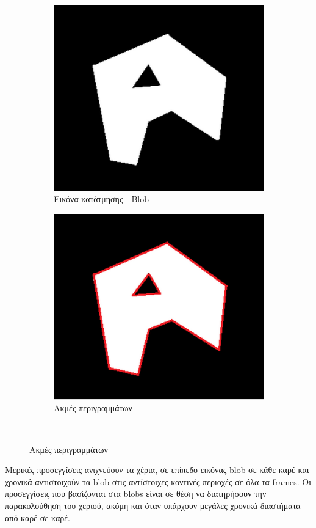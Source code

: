 \begin{figure}[H]
\begin{subfigure}{.5\textwidth}
  \centering
  \includegraphics[width=.6\linewidth]{Files/Figures/blob1.png}
  \caption[Εικόνα κατάτμησης - Blob]{Εικόνα κατάτμησης - Blob}
  \label{fig:sfig1}
\end{subfigure}%
\begin{subfigure}{.5\textwidth}
  \centering
  \includegraphics[width=.6\linewidth]{Files/Figures/blob2.png}
  \caption[Ακμές περιγραμμάτων]{Ακμές περιγραμμάτων}
  \label{fig:sfig2}
\end{subfigure}\\
\label{fig:fig}
\end{figure}





Μερικές προσεγγίσεις ανιχνεύουν τα χέρια, σε επίπεδο εικόνας blob σε κάθε καρέ και χρονικά αντιστοιχούν τα blob στις αντίστοιχες κοντινές περιοχές σε όλα τα frames. Οι προσεγγίσεις που βασίζονται στα blobs είναι σε θέση να διατηρήσουν την παρακολούθηση του χεριού, ακόμη και όταν υπάρχουν μεγάλες χρονικά διαστήματα από καρέ σε καρέ.



